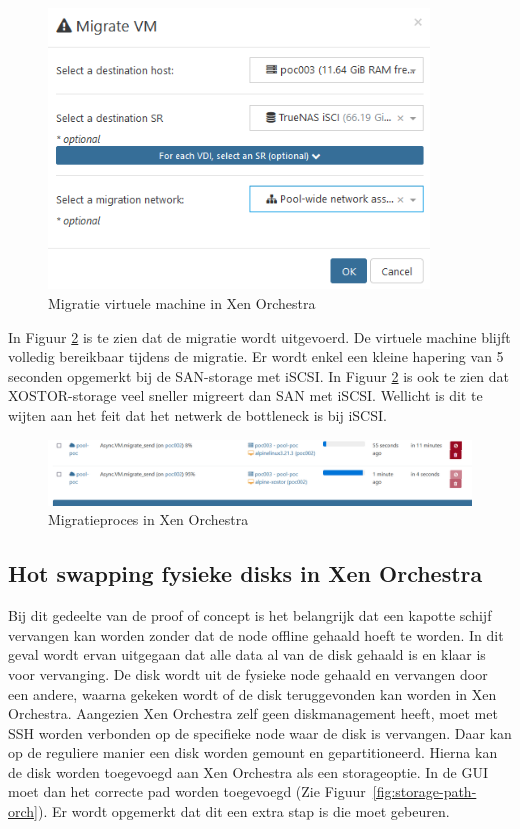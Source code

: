 \begin{figure}[H]
  \centering
  \hspace*{-1cm}  
  \includegraphics[width=0.9\textwidth]{../poc/migratie-vm-orch.png}
  \caption{Migratie virtuele machine in Xen Orchestra}
  \label{fig:migratie-vm-orch}
\end{figure}

In Figuur \ref{fig:migratie-proces-orch} is te zien dat de migratie wordt uitgevoerd. De virtuele machine blijft volledig bereikbaar tijdens de migratie. Er wordt enkel een kleine hapering van 5 seconden opgemerkt bij de SAN-storage met iSCSI.  
In Figuur \ref{fig:migratie-proces-orch} is ook te zien dat XOSTOR-storage veel sneller migreert dan SAN met iSCSI. Wellicht is dit te wijten aan het feit dat het netwerk de bottleneck is bij iSCSI.

\begin{figure}[H]
  \centering
  \includegraphics[width=1.1\textwidth]{../poc/migratie-proces-orch.png}
  \caption{Migratieproces in Xen Orchestra}
  \label{fig:migratie-proces-orch}  
\end{figure}


\subsection{Hot swapping fysieke disks in Xen Orchestra}%
Bij dit gedeelte van de proof of concept is het belangrijk dat een kapotte schijf vervangen kan worden zonder dat de node offline gehaald hoeft te worden.
In dit geval wordt ervan uitgegaan dat alle data al van de disk gehaald is en klaar is voor vervanging.
De disk wordt uit de fysieke node gehaald en vervangen door een andere, waarna gekeken wordt of de disk teruggevonden kan worden in Xen Orchestra.
Aangezien Xen Orchestra zelf geen diskmanagement heeft, moet met SSH worden verbonden op de specifieke node waar de disk is vervangen. Daar kan op de reguliere manier een disk worden gemount en gepartitioneerd.
Hierna kan de disk worden toegevoegd aan Xen Orchestra als een storageoptie. In de GUI moet dan het correcte pad worden toegevoegd (Zie Figuur~\ref{fig:storage-path-orch}). Er wordt opgemerkt dat dit een extra stap is die moet gebeuren.

